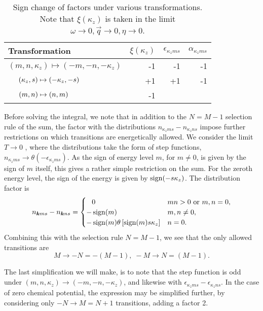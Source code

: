 \begin{table}[ht]
  \centering
  \begin{tabular}{l r r r}
    \toprule
    Transformation & \( \xi(\kappa_z) \) & \( \epsilon_{\kappa_z m s} \) & \( \alpha_{\kappa_z m s} \)\\
    \midrule
    \( (m, n, \kappa_z) \mapsto (-m, -n, -\kappa_z) \) & -1 & -1 & -1\\
    \( \hphantom{(m, n, \kappa_z)}\mathllap{(\kappa_z, s)} \mapsto (-\kappa_z, -s) \) & +1 & +1 & -1\\
    \(  \hphantom{(m, n, \kappa_z)}\mathllap{ (m, n)} \mapsto (n, m)\) & -1 &&\\
    \bottomrule
  \end{tabular}
  \caption{Sign change of factors under various transformations. Note that \( \xi(\kappa_z) \) is taken in the limit \( \omega\to0, \vec{q}\to 0, \eta\to 0 \). \label{tab:transform-sign}}
\end{table}

Before solving the integral, we note that in addition to the  \( N=M-1 \) selection rule of the sum, the factor with the distributions \( n_{\kappa_z m s} - n_{\kappa_z n s} \) impose further restrictions on which transitions are energetically allowed.
We consider the limit \( T \to 0 \) , where the distributions take the form of step functions, \( n_{\kappa_z m s} \to \theta(-\epsilon_{\kappa_z m s}) \).
As the sign of energy level \( m \), for \( m \neq 0 \), is given by the sign of \( m \) itself, this gives a rather simple restriction on the sum.
For the zeroth energy level, the sign of the energy is given by \( \operatorname{sign}(-s\kappa_z) \).
The distribution factor is
\begin{equation}
  \label{eq:92}
  n_{\bm{k} m s} - n_{\bm{k} n s} =
  \begin{cases}
    \phantom{-} 0 & m n > 0 \text{ or  } m,n = 0,\\
    - \operatorname{sign}(m) & m,n \neq 0,\\
    -\operatorname{sign}(m) \theta\left[\operatorname{sign}(m) s \kappa_z\right] & n = 0.
  \end{cases}
\end{equation}
Combining this with the selection rule \( N=M-1 \), we see that the only allowed transitions are
\[ M \to -N = -(M-1), \; -M \to N = (M-1). \]

The last simplification we will make, is to note that the step function is odd under \( (m, n, \kappa_z) \to (-m, -n, -\kappa_z) \), and likewise with \( \epsilon_{\kappa_z m s} - \epsilon_{\kappa_z n s} \).
In the case of zero chemical potential, the expression may be simplified further, by considering only \( -N \to M = N + 1\) transitions, adding a factor 2.

